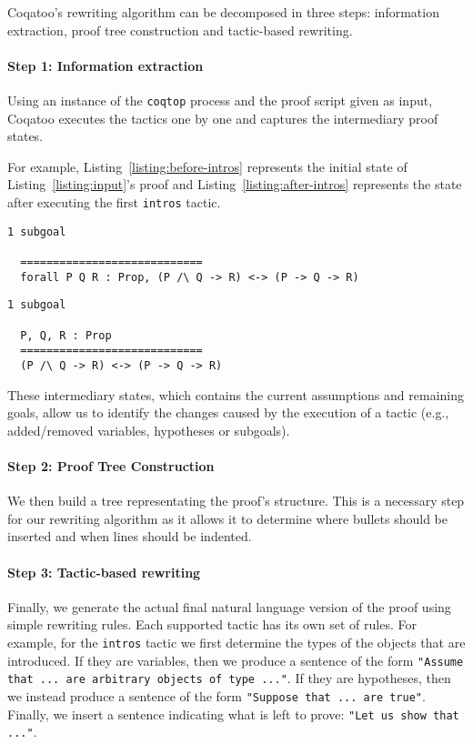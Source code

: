 \documentclass[sigplan,9pt]{acmart}\settopmatter{printfolios=true,printccs=false,printacmref=false}
\begin{document}
Coqatoo's rewriting algorithm can be decomposed in three steps: information extraction, proof tree construction and tactic-based rewriting. 

\paragraph{Step 1: Information extraction}
Using an instance of the \texttt{coqtop} process and the proof script given as input, Coqatoo executes the tactics one by one and captures the intermediary proof states. 

For example, Listing~\ref{listing:before-intros} represents the initial state of Listing~\ref{listing:input}'s proof and Listing~\ref{listing:after-intros} represents the state after executing the first \lstinline{intros} tactic.
\begin{lstlisting}[label=listing:before-intros, captionpos=b,caption={State before executing the first intros tactic}]
  1 subgoal
  
  ============================
  forall P Q R : Prop, (P /\ Q -> R) <-> (P -> Q -> R)
\end{lstlisting}
\pagebreak
\begin{lstlisting}[label=listing:after-intros,captionpos=b,caption={State after executing the first intros tactic}]
  1 subgoal
  
  P, Q, R : Prop
  ============================
  (P /\ Q -> R) <-> (P -> Q -> R)
\end{lstlisting}
These intermediary states, which contains the current assumptions and remaining goals, allow us to identify the changes caused by the execution of a tactic (e.g., added/removed variables, hypotheses or subgoals).

\paragraph{Step 2: Proof Tree Construction}
We then build a tree representating the proof's structure. This is a necessary step for our rewriting algorithm as it allows it to determine where bullets should be inserted and when lines should be indented.

\paragraph{Step 3: Tactic-based rewriting}
Finally, we generate the actual final natural language version of the proof using simple rewriting rules. Each supported tactic has its own set of rules. For example, for the \lstinline{intros} tactic we first determine the types of the objects that are introduced. If they are variables, then we produce a sentence of the form \lstinline{"Assume that ... are arbitrary objects of type ..."}. If they are hypotheses, then we instead produce a sentence of the form \lstinline{"Suppose that ... are true"}. Finally, we insert a sentence indicating what is left to prove: \lstinline{"Let us show that ..."}. 
\end{document}
